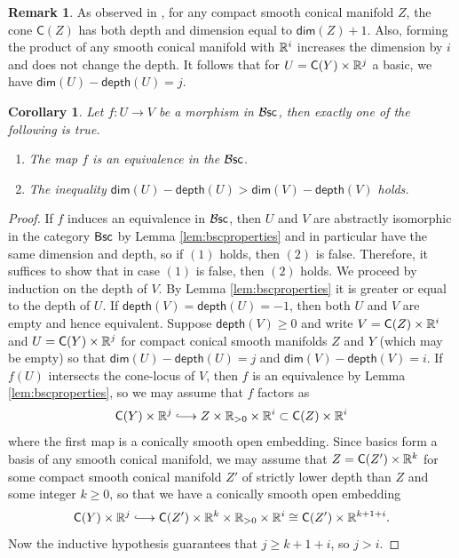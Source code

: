 \documentclass[10pt, reqno, twoside
, final
]{amsart}
\numberwithin{equation}{subsection}%
\theoremstyle{definition}
\theoremstyle{definition}
\theoremstyle{definition}
\theoremstyle{definition}
\theoremstyle{definition}
\theoremstyle{definition}
\theoremstyle{definition}
\theoremstyle{definition}
\theoremstyle{definition}
\theoremstyle{plain}
\theoremstyle{definition}
\theoremstyle{plain}
\theoremstyle{definition}
\theoremstyle{plain}
\newtheorem{cor}[defn]{Corollary}
\theoremstyle{definition}
\newtheorem{rmk}[defn]{Remark}
\theoremstyle{definition}
\theoremstyle{plain}
\theoremstyle{plain}
\theoremstyle{definition}
\theoremstyle{plain}
\theoremstyle{plain}
\theoremstyle{plain}
\begin{document}
\begin{rmk}
As observed in \cite[Example 2.4.7]{AFT-local-structures}, for any compact smooth conical manifold $Z$, the cone $\mathsf{C}(Z)$ has both depth and dimension equal to $\mathsf{dim}(Z)+1$. Also, forming the product of any smooth conical manifold with $\mathbb{R}^i$ increases the dimension by $i$ and does not change the depth. It follows that for $U=\mathsf{C}(Y)\times\mathbb{R}^j$ a basic, we have $\mathsf{dim}(U)-\mathsf{depth}(U)=j$.
\end{rmk}
\begin{cor}
Let $f:U\rightarrow V$ be a morphism in $\mathcal{B}\mathsf{sc}$, then exactly one of the following is true.
\begin{enumerate}[$(1)$]
    \item The map $f$ is an equivalence in the \infcat $\mathcal{B}\mathsf{sc}$.
    \item The inequality $\mathsf{dim}(U)-\mathsf{depth}(U)>\mathsf{dim}(V)-\mathsf{depth}(V)$ holds.
\end{enumerate}
\end{cor}
\begin{proof}
If $f$ induces an equivalence in $\mathcal{B}\mathsf{sc}$, then $U$ and $V$ are abstractly isomorphic in the category $\mathsf{Bsc}$ by Lemma \ref{lem:bscproperties} and in particular have the same dimension and depth, so if $(1)$ holds, then $(2)$ is false. Therefore, it suffices to show that in case $(1)$ is false, then $(2)$ holds. We proceed by induction on the depth of $V$.  By Lemma \ref{lem:bscproperties} it is greater or equal to the depth of $U$. If $\mathsf{depth}(V)=\mathsf{depth}(U)=-1$, then both $U$ and $V$ are empty and hence equivalent. Suppose $\mathsf{depth}(V)\geq 0$ and write $V=\mathsf{C}(Z)\times\mathbb{R}^i$ and $U=\mathsf{C}(Y)\times\mathbb{R}^j$ for compact conical smooth manifolds $Z$ and $Y$ (which may be empty) so that $\mathsf{dim}(U)-\mathsf{depth}(U)=j$ and $\mathsf{dim}(V)-\mathsf{depth}(V)=i$. If $f(U)$ intersects the cone-locus of $V$, then $f$ is an equivalence by Lemma \ref{lem:bscproperties}, so we may assume that $f$ factors as
\[ \mathsf{C}(Y)\times\R^j\hooklongrightarrow Z\times \R_{>0} \times\R^{i}  \subset \mathsf{C}(Z)\times\R^i   \]
where the first map is a conically smooth open embedding. Since basics form a basis of any smooth conical manifold, we may assume that $Z=\mathsf{C}(Z')\times\mathbb{R}^{k}$ for some compact smooth conical manifold $Z'$ of strictly lower depth than $Z$ and some integer $k\geq 0$, so that we have a conically smooth open embedding
\[ \mathsf{C}(Y)\times\R^j\hooklongrightarrow \mathsf{C}(Z')\times\R^{k}\times \R_{>0}\times\R^i \cong \mathsf{C}(Z')\times\R^{k+1+i}. \]
Now the inductive hypothesis guarantees that $j\geq k+1+i$, so $j>i$. 
\end{proof}
\end{document}
